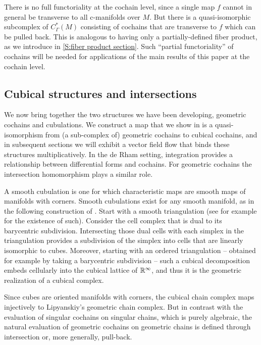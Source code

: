 There is no full functoriality at the cochain level, since a single map $f$ cannot in general be transverse to all c-manifolds over $M$.
But there is a quasi-isomorphic subcomplex of $C_\Gamma^*(M)$ consisting of cochains that are transverse to $f$ which can be pulled back.
This is analogous to having only a partially-defined fiber product, as we introduce in \cref{S:fiber product section}.
Such ``partial functoriality'' of cochains will be needed for applications of the main results of this paper at the cochain level.

\subsection{Cubical structures and intersections}

We now bring together the two structures we have been developing, geometric cochains and cubulations.
We construct a map that we show in \cite{medina2022foundations} is a quasi-isomorphism from (a sub-complex of) geometric cochains to cubical cochains, and in subsequent sections we will exhibit a vector field flow that binds these structures multiplicatively.
In the de Rham setting, integration provides a relationship between differential forms and cochains.
For geometric cochains the intersection homomorphism plays a similar role.

A smooth cubulation is one for which characteristic maps are smooth maps of manifolds with corners.
Smooth cubulations exist for any smooth manifold, as in the following construction of \cite{ShSh92}.
Start with a smooth triangulation (see for example \cite[Theorem 10.6]{Munk66} for the existence of such).
Consider the cell complex that is dual to its barycentric subdivision.
Intersecting those dual cells with each simplex in the triangulation provides a subdivision of the simplex into cells that are linearly isomorphic to cubes.
Moreover, starting with an ordered triangulation -- obtained for example by taking a barycentric subdivision -- such a cubical decomposition embeds cellularly into the cubical lattice of $\mathbb{R}^\infty$, and thus it is the geometric realization of a cubical complex.

Since cubes are oriented manifolds with corners, the cubical chain complex maps injectively to Lipyanskiy's geometric chain complex.
But in contrast with the evaluation of singular cochains on singular chains, which is purely algebraic, the natural evaluation of geometric cochains on geometric chains is defined through intersection or, more generally, pull-back.

